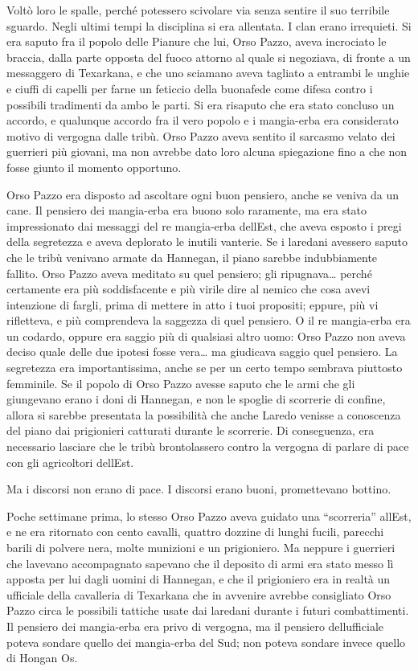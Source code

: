 Voltò loro le spalle, perché potessero scivolare via senza sentire il
suo terribile sguardo. Negli ultimi tempi la disciplina si era
allentata. I clan erano irrequieti. Si era saputo fra il popolo delle
Pianure che lui, Orso Pazzo, aveva incrociato le braccia, dalla parte
opposta del fuoco attorno al quale si negoziava, di fronte a un
messaggero di Texarkana, e che uno sciamano aveva tagliato a entrambi le
unghie e ciuffi di capelli per farne un feticcio della buonafede come
difesa contro i possibili tradimenti da ambo le parti. Si era risaputo
che era stato concluso un accordo, e qualunque accordo fra il vero
popolo e i mangia-erba era considerato motivo di vergogna dalle tribù.
Orso Pazzo aveva sentito il sarcasmo velato dei guerrieri più giovani,
ma non avrebbe dato loro alcuna spiegazione fino a che non fosse giunto
il momento opportuno.

Orso Pazzo era disposto ad ascoltare ogni buon pensiero, anche se veniva
da un cane. Il pensiero dei mangia-erba era buono solo raramente, ma era
stato impressionato dai messaggi del re mangia-erba
dell\textquotesingle Est, che aveva esposto i pregi della segretezza e
aveva deplorato le inutili vanterie. Se i laredani avessero saputo che
le tribù venivano armate da Hannegan, il piano sarebbe indubbiamente
fallito. Orso Pazzo aveva meditato su quel pensiero; gli
ripugnava\ldots{} perché certamente era più soddisfacente e più virile
dire al nemico che cosa avevi intenzione di fargli, prima di mettere in
atto i tuoi propositi; eppure, più vi rifletteva, e più comprendeva la
saggezza di quel pensiero. O il re mangia-erba era un codardo, oppure
era saggio più di qualsiasi altro uomo: Orso Pazzo non aveva deciso
quale delle due ipotesi fosse vera\ldots{} ma giudicava saggio quel
pensiero. La segretezza era importantissima, anche se per un certo tempo
sembrava piuttosto femminile. Se il popolo di Orso Pazzo avesse saputo
che le armi che gli giungevano erano i doni di Hannegan, e non le
spoglie di scorrerie di confine, allora si sarebbe presentata la
possibilità che anche Laredo venisse a conoscenza del piano dai
prigionieri catturati durante le scorrerie. Di conseguenza, era
necessario lasciare che le tribù brontolassero contro la vergogna di
parlare di pace con gli agricoltori dell\textquotesingle Est.

Ma i discorsi non erano di pace. I discorsi erano buoni, promettevano
bottino.

Poche settimane prima, lo stesso Orso Pazzo aveva guidato una
``scorreria'' all\textquotesingle Est, e ne era ritornato con cento
cavalli, quattro dozzine di lunghi fucili, parecchi barili di polvere
nera, molte munizioni e un prigioniero. Ma neppure i guerrieri che
l\textquotesingle avevano accompagnato sapevano che il deposito di armi
era stato messo lì apposta per lui dagli uomini di Hannegan, e che il
prigioniero era in realtà un ufficiale della cavalleria di Texarkana che
in avvenire avrebbe consigliato Orso Pazzo circa le possibili tattiche
usate dai laredani durante i futuri combattimenti. Il pensiero dei
mangia-erba era privo di vergogna, ma il pensiero
dell\textquotesingle ufficiale poteva sondare quello dei mangia-erba del
Sud; non poteva sondare invece quello di Hongan Os.

